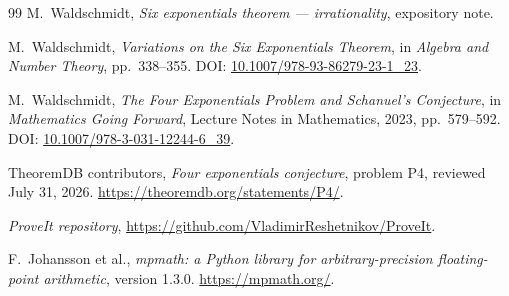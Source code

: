 \documentclass[11pt,oneside]{article}
\theoremstyle{definition}
\theoremstyle{remark}
\begin{document}
\begin{thebibliography}{99}
M.~Waldschmidt,
\newblock \emph{Six exponentials theorem --- irrationality},
\newblock expository note.

M.~Waldschmidt,
\newblock \emph{Variations on the Six Exponentials Theorem},
\newblock in \emph{Algebra and Number Theory}, pp.~338--355.
\newblock DOI: \href{https://doi.org/10.1007/978-93-86279-23-1_23}{10.1007/978-93-86279-23-1\_23}.

M.~Waldschmidt,
\newblock \emph{The Four Exponentials Problem and Schanuel's Conjecture},
\newblock in \emph{Mathematics Going Forward}, Lecture Notes in Mathematics, 2023,
pp.~579--592.
\newblock DOI: \href{https://doi.org/10.1007/978-3-031-12244-6_39}{10.1007/978-3-031-12244-6\_39}.

TheoremDB contributors,
\newblock \emph{Four exponentials conjecture}, problem P4, reviewed July 31, 2026.
\newblock \url{https://theoremdb.org/statements/P4/}.

\emph{ProveIt repository},
\newblock \url{https://github.com/VladimirReshetnikov/ProveIt}.

F.~Johansson et al.,
\newblock \emph{mpmath: a Python library for arbitrary-precision floating-point arithmetic},
\newblock version 1.3.0.
\newblock \url{https://mpmath.org/}.

\end{thebibliography}
\end{document}
